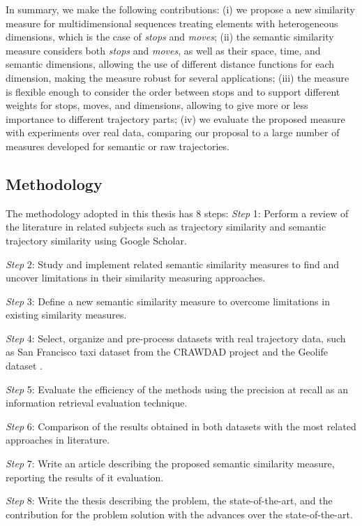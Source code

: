 \documentclass[12pt]{article}
\begin{document}
In summary, we make the following contributions:
(i) we propose a new similarity measure for multidimensional sequences treating elements with heterogeneous dimensions, which is the case of \emph{stops} and \emph{moves}; (ii) the semantic similarity measure considers both \textit{stops} and \textit{moves}, as well as their space, time, and semantic dimensions, allowing the use of different distance functions for each dimension, making the measure robust for several applications; (iii) the measure is flexible enough to consider the order between stops and to support different weights for stops, moves, and dimensions, allowing to give more or less importance to different trajectory parts; (iv) we evaluate the proposed measure with experiments over real data, comparing our proposal to a large number of measures developed for semantic or raw trajectories.

\subsection{Methodology}
The methodology adopted in this thesis has 8 steps:
\textit{Step} 1: Perform a review of the literature in related subjects such as trajectory similarity and semantic trajectory similarity using Google Scholar.

\textit{Step} 2: Study and implement related semantic similarity measures to find and uncover limitations in their similarity measuring approaches.

\textit{Step} 3: Define a new semantic similarity measure to overcome limitations in existing similarity measures.

\textit{Step} 4: Select, organize and pre-process datasets with real trajectory data, such as San Francisco taxi dataset from the CRAWDAD project\citep{epfl-mobility-20090224} and the Geolife dataset \citep{zheng2009mining}.

\textit{Step} 5: Evaluate the efficiency of the methods using the precision at recall \citep{baeza1999modern} as an information retrieval evaluation technique.

\textit{Step} 6: Comparison of the results obtained in both datasets with the most related approaches in literature.

\textit{Step} 7: Write an article describing the proposed semantic similarity measure, reporting the results of it evaluation.

\textit{Step} 8: Write the thesis describing the problem, the state-of-the-art, and the contribution for the problem solution with the advances over the state-of-the-art.
\end{document}
